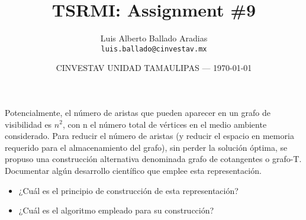 \documentclass{article}
\title{TSRMI: Assignment \#9} %
\author{Luis Alberto Ballado Aradias\\ \texttt{luis.ballado@cinvestav.mx}} %
\date{CINVESTAV UNIDAD TAMAULIPAS --- \today} %
\begin{document}
\maketitle %



Potencialmente, el número de aristas que pueden aparecer en un grafo de visibilidad es $n^{2}$, con n el número total de vértices en el medio ambiente considerado. Para reducir el número de aristas (y reducir el espacio en memoria requerido para el almacenamiento del grafo), sin perder la solución óptima, se propuso una construcción alternativa denominada grafo de cotangentes o grafo-T. \\
Documentar algún desarrollo científico que emplee esta representación.

\begin{itemize}
  \item ¿Cuál es el principio de construcción de esta representación?
  \item ¿Cuál es el algoritmo empleado para su construcción?
\end{itemize}

\end{document}
